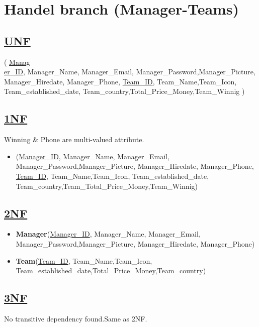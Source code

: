 \section{\texorpdfstring{\centering Handel branch (Manager-Teams)}{Supervise branch (Manager-Teams)}}

\subsection*{\underline{UNF}}

(
\underline{Manag\\er\_ID}, Manager\_Name, Manager\_Email, Manager\_Password,Manager\_Picture, Manager\_Hiredate, Manager\_Phone,
\underline{Team\_ID}, Team\_Name,Team\_Icon, Team\_established\_date, Team\_country,Total\_Price\_Money,Team\_Winnig
)

\subsection*{\underline{1NF}}

Winning \& Phone are multi-valued attribute.
\vskip 0.2in
\begin{itemize}
    \item
          (\underline{Manager\_ID}, Manager\_Name, Manager\_Email, Manager\_Password,Manager\_Picture, Manager\_Hiredate, Manager\_Phone,
          \underline{Team\_ID}, Team\_Name,Team\_Icon, Team\_established\_date, Team\_country,Team\_Total\_Price\_Money,Team\_Winnig)
\end{itemize}

\subsection*{\underline{2NF}}
\begin{itemize}
    \item \textbf{Manager}(\underline{Manager\_ID}, Manager\_Name, Manager\_Email, Manager\_Password,Manager\_Picture, Manager\_Hiredate, Manager\_Phone)
    \item \textbf{Team}(\underline{Team\_ID}, Team\_Name,Team\_Icon, Team\_established\_date,Total\_Price\_Money,Team\_country)
\end{itemize}

\subsection*{\underline{3NF}}
No transitive dependency found.Same as 2NF.

